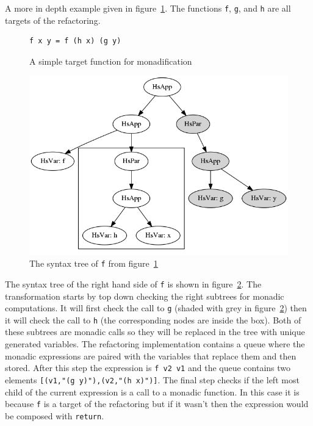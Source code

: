 A more in depth example given in figure~\ref{simpleMon}. The functions \texttt{f}, \texttt{g}, and \texttt{h} are all targets of the refactoring.

\begin{figure}[t]
\begin{lstlisting}
f x y = f (h x) (g y)
\end{lstlisting}
\caption{A simple target function for monadification}
\label{simpleMon}
\end{figure}  

\begin{figure}[t]
	\begin{center}
		\includegraphics[scale=.5]{graphVis/Chapter6/simpF.png}
	\end{center}
	\caption{The syntax tree of \texttt{f} from figure~\ref{simpleMon}}
	\label{simpF}
\end{figure}

The syntax tree of the right hand side of \texttt{f} is shown in figure~\ref{simpF}. The transformation starts by top down checking the right subtrees for monadic computations. It will first check the call to \texttt{g} (shaded with grey in figure~\ref{simpF}) then it will check the call to \texttt{h} (the corresponding nodes are inside the box). Both of these subtrees are monadic calls so they will be replaced in the tree with unique generated variables. The refactoring implementation contains a queue where the monadic expressions are paired with the variables that replace them and then stored. After this step the expression is \texttt{f v2 v1} and the queue contains two elements \texttt{[(v1,"(g y)"),(v2,"(h x)")]}. The final step checks if the left most child of the current expression is a call to a monadic function. In this case it is because \texttt{f} is a target of the refactoring but if it wasn't then the expression would be composed with \texttt{return}.


